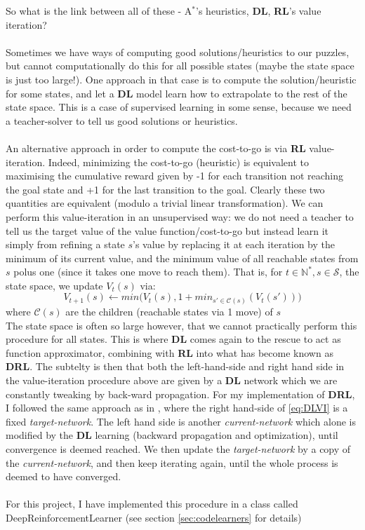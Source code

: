 So what is the link between all of these - A$^{*}$'s heuristics, \textbf{DL}, \textbf{RL}'s value iteration?
\\
\\
Sometimes we have ways of computing good solutions/heuristics to our puzzles, but cannot computationally do this for all possible states (maybe the state space is just too large!). One approach in that case is to compute the solution/heuristic for some states, and let a \textbf{DL} model learn how to extrapolate to the rest of the state space. This is a case of supervised learning in some sense, because we need a teacher-solver to tell us good solutions or heuristics.
\\
\\
An alternative approach in order to compute the cost-to-go is via \textbf{RL} value-iteration. Indeed, minimizing the cost-to-go (heuristic) is equivalent to maximising the cumulative reward given by -1 for each transition not reaching the goal state and +1 for the last transition to the goal. Clearly these two quantities are equivalent (modulo a trivial linear transformation). We can perform this value-iteration in an unsupervised way: we do not need a teacher to tell us the target value of the value function/cost-to-go but instead learn it simply from refining a state $s$'s value by replacing it at each iteration by the minimum of its current value, and the minimum value of all reachable states from $s$ polus one (since it takes one move to reach them). That is, for $t \in \mathbb{N}^{*}, s \in \mathcal{S}$, the state space, we update $V_{t}(s)$ via:
\begin{equation} \label{eq:DLVI}
V_{t+1}(s) \leftarrow min \Big( V_{t}(s), 1 + min_{s' \in \mathcal{C}(s)}(V_{t}(s'))  \Big)
\end{equation}
where $\mathcal{C}(s)$ are the children (reachable states via 1 move) of $s$
\\
The state space is often so large however, that we cannot practically perform this procedure for all states. This is where \textbf{DL} comes again to the rescue to act as function approximator, combining with \textbf{RL} into what has become known as \textbf{DRL}. The subtelty is then that both the left-hand-side and right hand side in the value-iteration procedure above are given by a \textbf{DL} network which we are constantly tweaking by back-ward propagation. For my implementation of \textbf{DRL}, I followed the same approach as in \cite{Mnih2013}, where the right hand-side of \ref{eq:DLVI} is a fixed \textit{target-network}. The left hand side is another \textit{current-network} which alone is modified by the \textbf{DL} learning (backward propagation and optimization), until convergence is deemed reached. We then update the \textit{target-network} by a copy of the \textit{current-network}, and then keep iterating again, until the whole process is deemed to have converged.
\\
\\
For this project, I have implemented this procedure in a class called DeepReinforcementLearner (see section \ref{sec:codelearners} for details)


